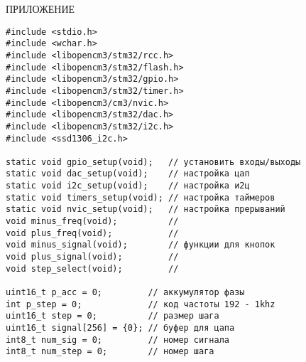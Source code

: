 \appendix
\newpage
{}
\begin{flushright}
\uppercase{Приложение}\label{appendix}
\end{flushright}
\begin{code}
\begin{verbatim}
#include <stdio.h>
#include <wchar.h>
#include <libopencm3/stm32/rcc.h>
#include <libopencm3/stm32/flash.h>
#include <libopencm3/stm32/gpio.h>
#include <libopencm3/stm32/timer.h>
#include <libopencm3/cm3/nvic.h>
#include <libopencm3/stm32/dac.h>
#include <libopencm3/stm32/i2c.h>
#include <ssd1306_i2c.h>

static void gpio_setup(void);   // установить входы/выходы
static void dac_setup(void);    // настройка цап
static void i2c_setup(void);    // настройка и2ц
static void timers_setup(void); // настройка таймеров
static void nvic_setup(void);   // настройка прерываний
void minus_freq(void);          //
void plus_freq(void);           //
void minus_signal(void);        // функции для кнопок
void plus_signal(void);         //
void step_select(void);         //

uint16_t p_acc = 0;         // аккумулятор фазы
int p_step = 0;             // код частоты 192 - 1khz
uint16_t step = 0;          // размер шага
uint16_t signal[256] = {0}; // буфер для цапа
int8_t num_sig = 0;         // номер сигнала
int8_t num_step = 0;        // номер шага


\end{verbatim}
\end{code}
